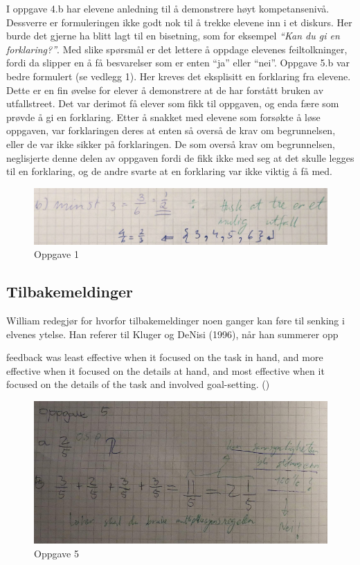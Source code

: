 \documentclass[main.tex]{subfiles}
\begin{document}
I oppgave 4.b har elevene anledning til å demonstrere høyt kompetansenivå. Dessverre er formuleringen ikke
godt nok til å trekke elevene inn i et diskurs. Her burde det gjerne ha blitt lagt til en bisetning, som 
for eksempel \emph{``Kan du gi en forklaring?''}. Med slike spørsmål er det lettere å oppdage elevenes
feiltolkninger, fordi da slipper en å få besvarelser som er enten ``ja'' eller ``nei''. Oppgave 
5.b var bedre formulert (se vedlegg 1). Her kreves det eksplisitt en forklaring fra elevene.
Dette er en fin øvelse for elever å demonstrere at de har forstått bruken av utfallstreet. Det var derimot
få elever som fikk til oppgaven, og enda fære som prøvde å gi en forklaring. Etter å snakket med elevene
som forsøkte å løse oppgaven, var forklaringen deres at enten så overså de krav om begrunnelsen, eller de var
ikke sikker på forklaringen. De som overså krav om begrunnelsen, neglisjerte denne delen av oppgaven fordi
de fikk ikke med seg at det skulle legges til en forklaring, og de andre svarte at en forklaring var ikke
viktig å få med.

\begin{figure}[h]
\centering
\includegraphics[scale = 0.4]{../figures/maryam.png}
\caption{Oppgave 1}
\label{fig:maryam}
\end{figure}

\subsection*{Tilbakemeldinger}

William redegjør for hvorfor tilbakemeldinger noen ganger kan føre til senking 
i elvenes ytelse. Han referer til Kluger og DeNisi (1996), når han summerer opp 
\begin{displayquote}
\textelp{} feedback was least effective when it focused on the task in hand, 
and more effective when it focused on the details at hand, and most effective 
when it focused on the details of the task and involved goal-setting.
()
\end{displayquote}

\begin{figure}[h!]
\centering
\includegraphics[scale = 0.4]{../figures/mohsin.png}
\caption{Oppgave 5}
\label{fig:mohsin}
\end{figure}
\end{document}
